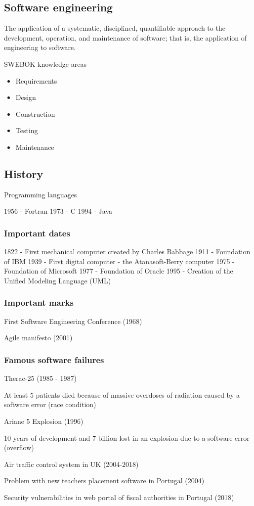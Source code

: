 \documentclass[../ESOF_notes.tex]{subfiles}
\begin{document}
 

\subsection{Software engineering}

The application of a systematic, disciplined,
quantifiable approach to the development, operation, and
maintenance of software; that is, the application of
engineering to software.

SWEBOK knowledge areas

\begin{itemize}
    \item Requirements
    \item Design
    \item Construction
    \item Testing
    \item Maintenance
\end{itemize}

\subsection{History}

Programming languages

1956 - Fortran
1973 - C
1994 - Java

\subsubsection{Important dates}

1822 - First mechanical computer created by Charles Babbage
1911 - Foundation of IBM
1939 - First digital computer - the Atanasoft-Berry computer
1975 - Foundation of Microsoft
1977 - Foundation of Oracle
1995 - Creation of the Unified Modeling Language (UML)

\subsubsection{Important marks}

First Software Engineering Conference (1968)

Agile manifesto (2001)

\subsubsection{Famous software failures}

Therac-25 (1985 - 1987)

At least 5 patients died because of massive overdoses of
radiation caused by a software error (race condition)

Ariane 5 Explosion (1996)

10 years of development and 7 billion lost in an
explosion due to a software error (overflow)

Air traffic control system in UK (2004-2018)

Problem with new teachers placement
software in Portugal (2004)

Security vulnerabilities in web portal of
fiscal authorities in Portugal (2018)
\end{document}
